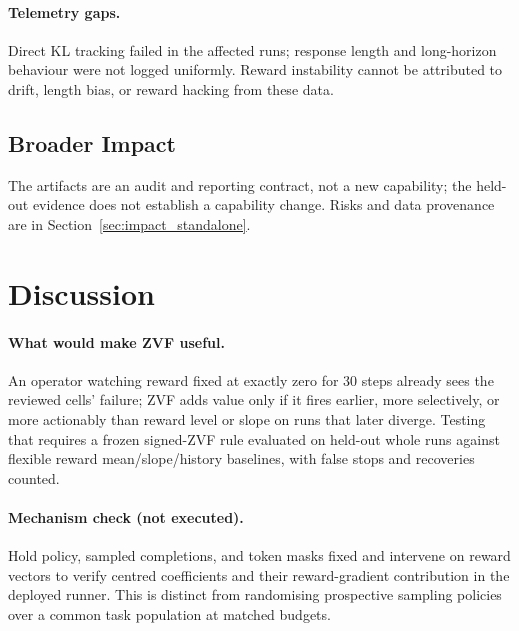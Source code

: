 \documentclass{article}
\begin{document}
\paragraph{Telemetry gaps.}
Direct KL tracking failed in the affected runs; response length and long-horizon
behaviour were not logged uniformly. Reward instability cannot be attributed to
drift, length bias, or reward hacking from these data.

\subsection{Broader Impact}
\label{sec:impact}
The artifacts are an audit and reporting contract, not a new capability; the
held-out evidence does not establish a capability change. Risks and data
provenance are in Section~\ref{sec:impact_standalone}.

\section{Discussion}
\label{sec:discussion}

\paragraph{What would make ZVF useful.}
An operator watching reward fixed at exactly zero for 30 steps already sees the
reviewed cells' failure; ZVF adds value only if it fires earlier, more
selectively, or more actionably than reward level or slope on runs that later
diverge. Testing that requires a frozen signed-ZVF rule evaluated on held-out
whole runs against flexible reward mean/slope/history baselines, with false
stops and recoveries counted.

\paragraph{Mechanism check (not executed).}
Hold policy, sampled completions, and token masks fixed and intervene on reward
vectors to verify centred coefficients and their reward-gradient contribution in
the deployed runner. This is distinct from randomising prospective sampling
policies over a common task population at matched budgets.
\end{document}
